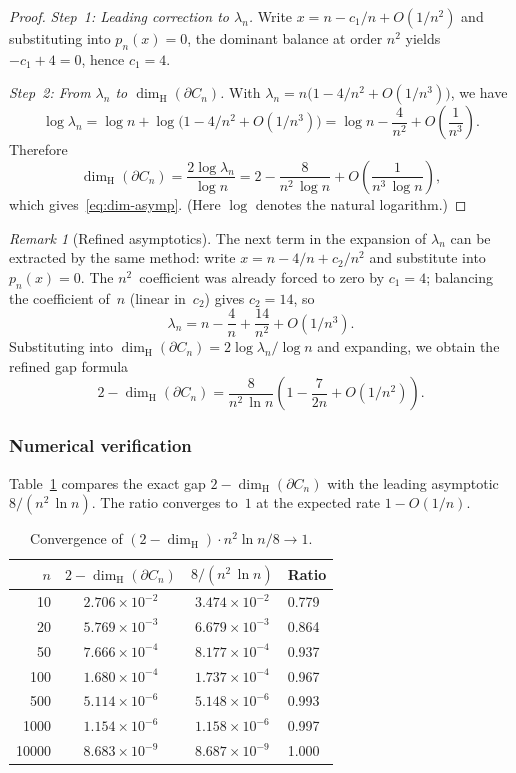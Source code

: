 \documentclass{amsart}
\theoremstyle{definition}
\theoremstyle{remark}
\newtheorem{remark}[theorem]{Remark}
\newcommand{\dH}{\dim_{\mathrm{H}}}
\begin{document}
\begin{proof}
\emph{Step~1: Leading correction to $\lambda_n$.}
Write $x = n - c_1/n + O(1/n^2)$
and substituting into $p_n(x) = 0$, the dominant balance at order
$n^2$ yields $-c_1 + 4 = 0$, hence $c_1 = 4$.

\emph{Step~2: From $\lambda_n$ to $\dH(\partial C_n)$.}
With $\lambda_n = n\bigl(1 - 4/n^2 + O(1/n^3)\bigr)$, we have
\[
  \log\lambda_n = \log n + \log\!\bigl(1 - 4/n^2 + O(1/n^3)\bigr)
  = \log n - \frac{4}{n^2} + O\!\left(\frac{1}{n^3}\right).
\]
Therefore
\[
  \dH(\partial C_n) = \frac{2\log\lambda_n}{\log n}
  = 2 - \frac{8}{n^2\,\log n} + O\!\left(\frac{1}{n^3\,\log n}\right),
\]
which gives~\eqref{eq:dim-asymp}.  (Here $\log$ denotes the natural
logarithm.)
\end{proof}

\begin{remark}[Refined asymptotics]
The next term in the expansion of $\lambda_n$ can be extracted by the
same method: write $x = n - 4/n + c_2/n^2$ and substitute into
$p_n(x) = 0$.  The $n^2$~coefficient was already forced to zero by
$c_1 = 4$; balancing the coefficient of~$n$ (linear in~$c_2$) gives
$c_2 = 14$, so
\[
  \lambda_n = n - \frac{4}{n} + \frac{14}{n^2} + O(1/n^3).
\]
Substituting into $\dH(\partial C_n) = 2\log\lambda_n / \log n$ and
expanding, we obtain the refined gap formula
\[
  2 - \dH(\partial C_n)
  = \frac{8}{n^2\,\ln n}\left(1 - \frac{7}{2n} + O(1/n^2)\right).
\]
\end{remark}

\subsubsection{Numerical verification}

Table~\ref{tab:ratio} compares the exact gap $2 - \dH(\partial C_n)$
with the leading asymptotic $8/(n^2\,\ln n)$.  The ratio converges to~$1$
at the expected rate $1 - O(1/n)$.

\begin{table}[h]
\centering
\caption{Convergence of $(2 - \dH) \cdot n^2 \ln n / 8 \to 1$.}
\label{tab:ratio}
\begin{tabular}{rccl}
\toprule
$n$ & $2 - \dH(\partial C_n)$ & $8/(n^2\,\ln n)$ & Ratio \\
\midrule
   10 & $2.706 \times 10^{-2}$ & $3.474 \times 10^{-2}$ & 0.779 \\
   20 & $5.769 \times 10^{-3}$ & $6.679 \times 10^{-3}$ & 0.864 \\
   50 & $7.666 \times 10^{-4}$ & $8.177 \times 10^{-4}$ & 0.937 \\
  100 & $1.680 \times 10^{-4}$ & $1.737 \times 10^{-4}$ & 0.967 \\
  500 & $5.114 \times 10^{-6}$ & $5.148 \times 10^{-6}$ & 0.993 \\
 1000 & $1.154 \times 10^{-6}$ & $1.158 \times 10^{-6}$ & 0.997 \\
10000 & $8.683 \times 10^{-9}$ & $8.687 \times 10^{-9}$ & 1.000 \\
\bottomrule
\end{tabular}
\end{table}
\end{document}
